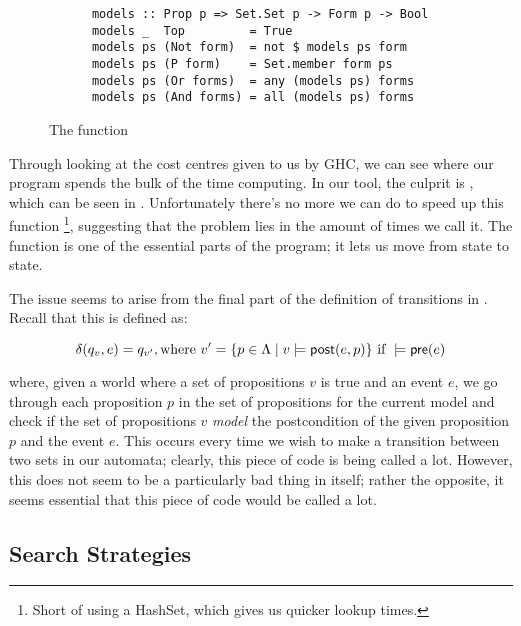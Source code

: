 \documentclass[10pt, a4paper]{report}
\begin{document}
\begin{wrapfigure}{r}{0.5\textwidth}
  \begin{center}
    \begin{verbatim}
      models :: Prop p => Set.Set p -> Form p -> Bool
      models _  Top         = True
      models ps (Not form)  = not $ models ps form
      models ps (P form)    = Set.member form ps
      models ps (Or forms)  = any (models ps) forms
      models ps (And forms) = all (models ps) forms
    \end{verbatim}
  \end{center}
  \caption{The  function}
  \label{fig:modelsfunction}
\end{wrapfigure}

Through looking at the cost centres given to us by GHC, we can see where our
program spends the bulk of the time computing. In our tool, the culprit is
, which can be seen in . Unfortunately
there's no more we can do to speed up this function \footnote{Short of using a
  HashSet, which gives us quicker lookup times.}, suggesting that the problem
lies in the amount of times we call it. The function is one of the essential
parts of the program; it lets us move from state to state.

The issue seems to arise from the final part of the definition of transitions in
\mestar. Recall that this is defined as:

\begin{equation} \label{eq:delta1}
  \delta(q_v, e) = q_{v'}, \text{where } v' = \{p \in \Lambda \mid v \models \textsf{post}(e, p)\}
  \text{ if } 
  \models \textsf{pre}(e)
\end{equation}

\noindent where, given a world where a set of propositions $v$ is true and an
event $e$, we go through each proposition $p$ in the set of propositions for the
current model and check if the set of propositions $v$ \emph{model} the postcondition
of the given proposition $p$ and the event $e$. This occurs every time we wish
to make a transition between two sets in our automata; clearly, this piece of
code is being called a lot. However, this does not seem to be a particularly bad
thing in itself; rather the opposite, it seems essential that this piece of code
would be called a lot.

\subsection{Search Strategies}
\end{document}
